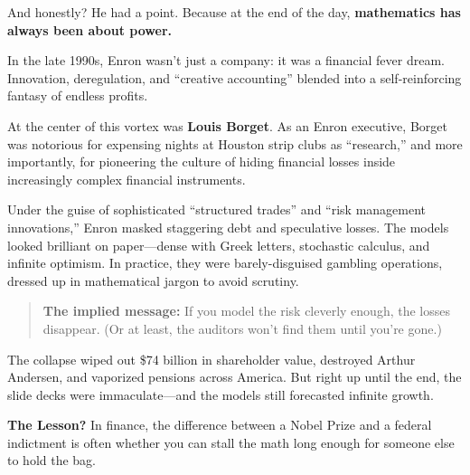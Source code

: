 And honestly? He had a point. Because at the end of the day, \textbf{mathematics has always been about power.}

\medskip

\begin{tcolorbox}[colback=blue!5!white, colframe=blue!50!black, breakable,
  title={Historical Sidebar: Louis Borget and the Enron Math Illusion}]

In the late 1990s, Enron wasn’t just a company: it was a financial fever dream.  Innovation, deregulation, and ``creative accounting'' blended into a self-reinforcing fantasy of endless profits.

\medskip

At the center of this vortex was \textbf{Louis Borget}.  As an Enron executive, Borget was notorious for expensing nights at Houston strip clubs as ``research,'' and more importantly, for pioneering the culture of hiding financial losses inside increasingly complex financial instruments.

\medskip

Under the guise of sophisticated ``structured trades'' and ``risk management innovations,'' Enron masked staggering debt and speculative losses.  The models looked brilliant on paper—dense with Greek letters, stochastic calculus, and infinite optimism.  In practice, they were barely-disguised gambling operations, dressed up in mathematical jargon to avoid scrutiny.

\medskip

\begin{quote}
\textbf{The implied message:} If you model the risk cleverly enough, the losses disappear. (Or at least, the auditors won’t find them until you’re gone.)
\end{quote}

\medskip

The collapse wiped out \$74 billion in shareholder value, destroyed Arthur Andersen, and vaporized pensions across America.  But right up until the end, the slide decks were immaculate—and the models still forecasted infinite growth.

\medskip

\textbf{The Lesson?} In finance, the difference between a Nobel Prize and a federal indictment is often whether you can stall the math long enough for someone else to hold the bag.

\end{tcolorbox}

\medskip

